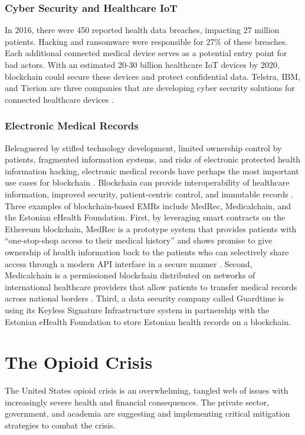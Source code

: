 \documentclass[sigconf]{acmart}
\begin{document}
\subsubsection{Cyber Security and Healthcare IoT}
In 2016, there were 450 reported health data breaches, impacting 27 million patients. Hacking and ransomware were responsible for 27\% of these breaches. Each additional connected medical device serves as a potential entry point for bad actors. With an estimated 20-30 billion healthcare IoT devices by 2020, blockchain could secure these devices and protect confidential data. Telstra, IBM, and Tierion are three companies that are developing cyber security solutions for connected healthcare devices \cite{das2017}.

\subsubsection{Electronic Medical Records} Beleaguered by stifled technology development, limited ownership control by patients, fragmented information systems, and risks of electronic protected health information hacking, electronic medical records have perhaps the most important use cases for blockchain \cite{yuan2016blockchains}. Blockchain can provide interoperability of healthcare information, improved security, patient-centric control, and immutable records \cite{das2017}. Three examples of blockchain-based EMRs include MedRec, Medicalchain, and the Estonian eHealth Foundation. First, by leveraging smart contracts on the Ethereum blockchain, MedRec is a prototype system that provides patients with ``one-stop-shop access to their medical history'' and shows promise to give ownership of health information back to the patients who can selectively share access through a modern API interface in a secure manner \cite{ekblaw2016medrec}. Second, Medicalchain is a permissioned blockchain distributed on networks of international healthcare providers that allow patients to transfer medical records across national borders \cite{hitchingHealthcare}. Third, a data security company called Guardtime is using its Keyless Signature Infrastructure system in partnership with the Estonian eHealth Foundation to store Estonian health records on a blockchain.





\section{The Opioid Crisis}
The United States opioid crisis is an overwhelming, tangled web of issues with increasingly severe health and financial consequences. The private sector, government, and academia are suggesting and implementing critical mitigation strategies to combat the crisis.
\end{document}
